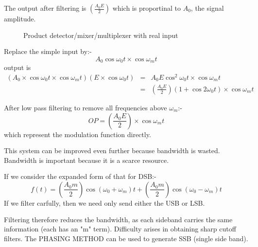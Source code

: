 \documentclass[11pt]{article} %
\begin{document}
The output after filtering is $\left(\frac{A_0E}{2}\right)$ which is proportinal to $A_0$, the signal amplitude.


		\begin{figure}[h]
		\centering
		\caption{Product detector/mixer/multiplexer with real input}
	\end{figure}

Replace the simple input by:-
\begin{equation}
A_0\cos{\omega_0 t} \times \cos{\omega_m t}
\end{equation}
output is
\begin{eqnarray}
(A_0 \times \cos{\omega_0t} \times \cos{\omega_m t})(E\times\cos{\omega_0 t})
&=& A_0 E \cos^2{\omega_0 t}\times\cos{\omega_m t} \\
&=& \left(\frac{A_0 E}{2}\right)(1+\cos{2 \omega_0 t}) \times \cos{\omega_m t}
\end{eqnarray}

After low pass filtering to remove all frequencies above $\omega_m$:-
\begin{equation}
OP = \left(\frac{A_0 E}{2}\right) \times \cos{\omega_m t}
\end{equation}which represent the modulation function directly.

This system can be improved even further because bandwidth is wasted. Bandwidth is important because it is a scarce resource.

If we consider the expanded form of that for DSB:-
\begin{equation}
f(t) = \left(\frac{A_0m}{2} \right) \cos{\left(\omega_0 + \omega_m\right)}t + \left(\frac{A_0m}{2} \right)  \cos{\left(\omega_0 - \omega_m\right)}t 
\end{equation}
If we filter carfully, then we need only send either the USB or LSB.


Filtering therefore reduces the bandwidth, as each sideband carries the same information (each has an "m" term). Difficulty arises in obtaining sharp cutoff filters. The PHASING METHOD can be used to generate SSB (single side band).
\end{document}
